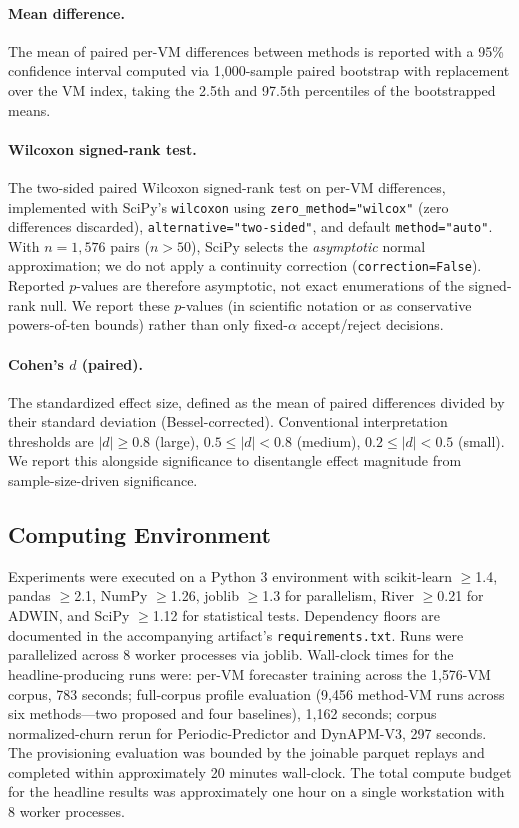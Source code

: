 \documentclass[manuscript,screen,review,anonymous]{acmart}
\begin{document}
\paragraph{Mean difference.} The mean of paired per-VM differences
between methods is reported with a 95\% confidence interval
computed via 1{,}000-sample paired bootstrap with replacement
over the VM index, taking the 2.5th and 97.5th percentiles of
the bootstrapped means.

\paragraph{Wilcoxon signed-rank test.} The two-sided paired Wilcoxon
signed-rank test on per-VM differences, implemented with SciPy's
\texttt{wilcoxon} using \texttt{zero\_method="wilcox"} (zero
differences discarded), \texttt{alternative="two-sided"}, and
default \texttt{method="auto"}. With $n=1{,}576$ pairs
($n>50$), SciPy selects the \emph{asymptotic} normal
approximation; we do not apply a continuity correction
(\texttt{correction=False}). Reported $p$-values are therefore
asymptotic, not exact enumerations of the signed-rank null.
We report these $p$-values (in scientific notation or as
conservative powers-of-ten bounds) rather than only fixed-$\alpha$
accept/reject decisions.

\paragraph{Cohen's $d$ (paired).} The standardized effect size,
defined as the mean of paired differences divided by their
standard deviation (Bessel-corrected). Conventional
interpretation thresholds are $|d| \geq 0.8$ (large),
$0.5 \leq |d| < 0.8$ (medium), $0.2 \leq |d| < 0.5$ (small). We
report this alongside significance to disentangle effect magnitude
from sample-size-driven significance.

\subsection{Computing Environment}\label{sec:setup-environment}

Experiments were executed on a Python 3 environment with
scikit-learn $\geq$1.4, pandas $\geq$2.1, NumPy $\geq$1.26,
joblib $\geq$1.3 for parallelism, River $\geq$0.21 for ADWIN, and
SciPy $\geq$1.12 for statistical tests. Dependency floors are
documented in the accompanying artifact's
\texttt{requirements.txt}. Runs were parallelized across 8 worker
processes via joblib. Wall-clock times for the headline-producing
runs were: per-VM forecaster training across the 1{,}576-VM
corpus, 783 seconds; full-corpus profile evaluation (9{,}456
method-VM runs across six methods---two proposed and four
baselines), 1{,}162 seconds; corpus normalized-churn rerun for
Periodic-Predictor and DynAPM-V3, 297 seconds. The provisioning
evaluation was bounded by the joinable parquet replays and
completed within approximately 20 minutes wall-clock. The total
compute budget for the headline results was approximately one hour
on a single workstation with 8 worker processes.
\end{document}
